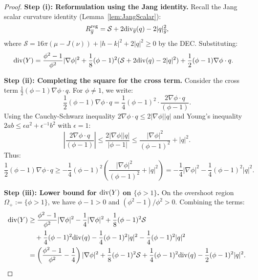 \begin{proof}
\textbf{Step (i): Reformulation using the Jang identity.}
Recall the Jang scalar curvature identity (Lemma~\ref{lem:JangScalar}):
\begin{equation}
    R^{\mathrm{reg}}_{\overline{g}} = \mathcal{S} + 2\mathrm{div}_{\overline{g}}(q) - 2|q|^2_{\overline{g}},
\end{equation}
where $\mathcal{S} = 16\pi(\mu - J(\nu)) + |h-k|^2 + 2|q|^2 \ge 0$ by the DEC. Substituting:
\begin{align}
    \mathrm{div}(Y) &= \frac{\phi^2-1}{\phi^2}|\nabla \phi|^2 + \frac{1}{8}(\phi-1)^2 (\mathcal{S} + 2\mathrm{div}(q) - 2|q|^2) + \frac{1}{2}(\phi-1)\nabla\phi \cdot q.
\end{align}

\textbf{Step (ii): Completing the square for the cross term.}
Consider the cross term $\frac{1}{2}(\phi-1)\nabla\phi \cdot q$. For $\phi \neq 1$, we write:
\begin{equation}
    \frac{1}{2}(\phi-1)\nabla\phi \cdot q = \frac{1}{4}(\phi-1)^2 \cdot \frac{2\nabla\phi \cdot q}{(\phi-1)}.
\end{equation}
Using the Cauchy-Schwarz inequality $2\nabla\phi \cdot q \le 2|\nabla\phi||q|$ and Young's inequality $2ab \le \epsilon a^2 + \epsilon^{-1}b^2$ with $\epsilon = 1$:
\begin{equation}
    \left|\frac{2\nabla\phi \cdot q}{(\phi-1)}\right| \le \frac{2|\nabla\phi||q|}{|\phi-1|} \le \frac{|\nabla\phi|^2}{(\phi-1)^2} + |q|^2.
\end{equation}
Thus:
\begin{equation}\label{eq:CrossTermBound}
    \frac{1}{2}(\phi-1)\nabla\phi \cdot q \ge -\frac{1}{4}(\phi-1)^2\left(\frac{|\nabla\phi|^2}{(\phi-1)^2} + |q|^2\right) = -\frac{1}{4}|\nabla\phi|^2 - \frac{1}{4}(\phi-1)^2|q|^2.
\end{equation}

\textbf{Step (iii): Lower bound for $\mathrm{div}(Y)$ on $\{\phi > 1\}$.}
On the overshoot region $\Omega_+ := \{\phi > 1\}$, we have $\phi - 1 > 0$ and $(\phi^2-1)/\phi^2 > 0$. Combining the terms:
\begin{align}
    \mathrm{div}(Y) &\ge \frac{\phi^2-1}{\phi^2}|\nabla \phi|^2 - \frac{1}{4}|\nabla\phi|^2 + \frac{1}{8}(\phi-1)^2 \mathcal{S} \\
    &\quad + \frac{1}{4}(\phi-1)^2 \mathrm{div}(q) - \frac{1}{4}(\phi-1)^2|q|^2 - \frac{1}{4}(\phi-1)^2|q|^2 \\
    &= \left(\frac{\phi^2-1}{\phi^2} - \frac{1}{4}\right)|\nabla \phi|^2 + \frac{1}{8}(\phi-1)^2 \mathcal{S} + \frac{1}{4}(\phi-1)^2 \mathrm{div}(q) - \frac{1}{2}(\phi-1)^2|q|^2.
\end{align}


\end{proof}
